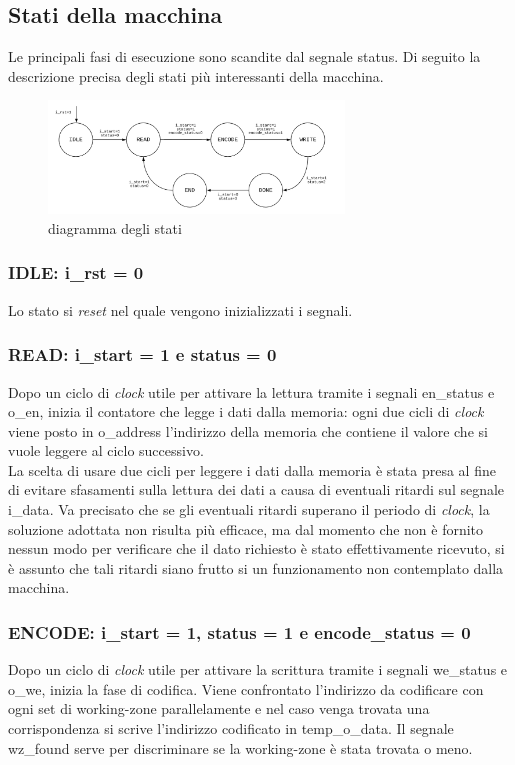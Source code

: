 \documentclass{article}
\begin{document}
\subsection{Stati della macchina}
Le principali fasi di esecuzione sono scandite dal segnale {\selectfont status}. Di seguito la descrizione precisa degli stati più interessanti della macchina.
\begin{figure}[h]
    \centering
    \includegraphics[width=0.7\textwidth]{fsa}
    \caption{diagramma degli stati}
\end{figure}
\subsubsection{IDLE: {\selectfont i\_rst} = 0}
Lo stato si \textit{reset} nel quale vengono inizializzati i segnali.
\subsubsection{READ: {\selectfont i\_start} = 1 e {\selectfont status} = 0}
Dopo un ciclo di \textit{clock} utile per attivare la lettura tramite i segnali {\selectfont en\_status} e {\selectfont o\_en}, inizia il contatore che legge i dati dalla memoria: ogni due cicli di \textit{clock} viene posto in {\selectfont o\_address} l'indirizzo della memoria che contiene il valore che si vuole leggere al ciclo successivo.\\La scelta di usare due cicli per leggere i dati dalla memoria è stata presa al fine di evitare sfasamenti sulla lettura dei dati a causa di eventuali ritardi sul segnale {\selectfont i\_data}. Va precisato che se gli eventuali ritardi superano il periodo di \textit{clock}, la soluzione adottata non risulta più efficace, ma dal momento che non è fornito nessun modo per verificare che il dato richiesto è stato effettivamente ricevuto, si è assunto che tali ritardi siano frutto si un funzionamento non contemplato dalla macchina.
\subsubsection{ENCODE: {\selectfont i\_start} = 1, {\selectfont status} = 1 e {\selectfont encode\_status} = 0}
Dopo un ciclo di \textit{clock} utile per attivare la scrittura tramite i segnali {\selectfont we\_status} e {\selectfont o\_we}, inizia la fase di codifica. Viene confrontato l'indirizzo da codificare con ogni set di working-zone parallelamente e nel caso venga trovata una corrispondenza si scrive l'indirizzo codificato in {\selectfont temp\_o\_data}. Il segnale {\selectfont wz\_found} serve per discriminare se la working-zone è stata trovata o meno.
\end{document}
